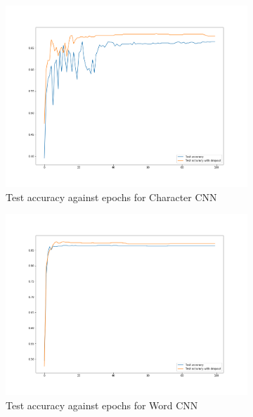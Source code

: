 \begin{figure}[H]
    \begin{subfigure}{0.5\textwidth}
        \centering
        \includegraphics[width=1\linewidth]{assets/plots2/q1_4.png}
        \caption{Test accuracy against epochs for Character CNN}
    \end{subfigure}
    \begin{subfigure}{0.5\textwidth}
        \centering
        \includegraphics[width=1\linewidth]{assets/plots2/q2_4.png}
        \caption{Test accuracy against epochs for Word CNN}
    \end{subfigure}
    \begin{subfigure}{0.5\textwidth}
        \centering

\end{subfigure}
\end{figure}
